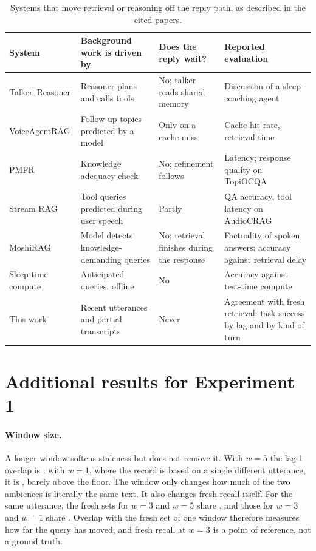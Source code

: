 \documentclass[10pt]{article}
\begin{document}
\begin{table}[h]
\caption{Systems that move retrieval or reasoning off the reply path, as described in the cited papers.}
\label{tab:related}
\vspace{4pt}
\centering
\small
\begin{tabularx}{\linewidth}{@{}>{\raggedright\arraybackslash}p{2.6cm}YY>{\raggedright\arraybackslash}p{4.2cm}@{}}
\toprule
System & Background work is driven by & Does the reply wait? & Reported evaluation \\
\midrule
Talker--Reasoner & Reasoner plans and calls tools & No; talker reads shared memory & Discussion of a sleep-coaching agent \\
\addlinespace[2pt]
VoiceAgentRAG & Follow-up topics predicted by a model & Only on a cache miss & Cache hit rate, retrieval time \\
\addlinespace[2pt]
PMFR & Knowledge adequacy check & No; refinement follows & Latency; response quality on TopiOCQA \\
\addlinespace[2pt]
Stream RAG & Tool queries predicted during user speech & Partly & QA accuracy, tool latency on AudioCRAG \\
\addlinespace[2pt]
MoshiRAG & Model detects knowledge-demanding queries & No; retrieval finishes during the response & Factuality of spoken answers; accuracy against retrieval delay \\
\addlinespace[2pt]
Sleep-time compute & Anticipated queries, offline & No & Accuracy against test-time compute \\
\midrule
This work & Recent utterances and partial transcripts & Never & Agreement with fresh retrieval; task success by lag and by kind of turn \\
\bottomrule
\end{tabularx}
\end{table}

\section{Additional results for Experiment 1}
\label{app:e1}

\paragraph{Window size.} A longer window softens staleness but does not remove it. With $w=5$ the lag-1 overlap is \OvWfiveLone{}; with $w=1$, where the record is based on a single different utterance, it is \OvWoneLone{}, barely above the floor. The window only changes how much of the two ambiences is literally the same text. It also changes fresh recall itself. For the same utterance, the fresh sets for $w=3$ and $w=5$ share \OvFreshWfive{} \OvFreshWfiveCI{}, and those for $w=3$ and $w=1$ share \OvFreshWone{}. Overlap with the fresh set of one window therefore measures how far the query has moved, and fresh recall at $w=3$ is a point of reference, not a ground truth.
\end{document}
